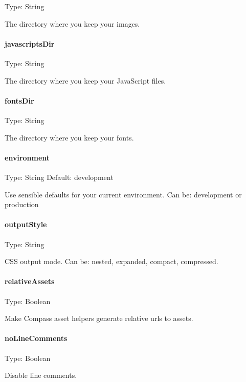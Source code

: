 Type\+: {\ttfamily String}

The directory where you keep your images.

\paragraph*{javascripts\+Dir}

Type\+: {\ttfamily String}

The directory where you keep your Java\+Script files.

\paragraph*{fonts\+Dir}

Type\+: {\ttfamily String}

The directory where you keep your fonts.

\paragraph*{environment}

Type\+: {\ttfamily String} Default\+: {\ttfamily development}

Use sensible defaults for your current environment. Can be\+: {\ttfamily development} or {\ttfamily production}

\paragraph*{output\+Style}

Type\+: {\ttfamily String}

C\+SS output mode. Can be\+: {\ttfamily nested}, {\ttfamily expanded}, {\ttfamily compact}, {\ttfamily compressed}.

\paragraph*{relative\+Assets}

Type\+: {\ttfamily Boolean}

Make Compass asset helpers generate relative urls to assets.

\paragraph*{no\+Line\+Comments}

Type\+: {\ttfamily Boolean}

Disable line comments.

